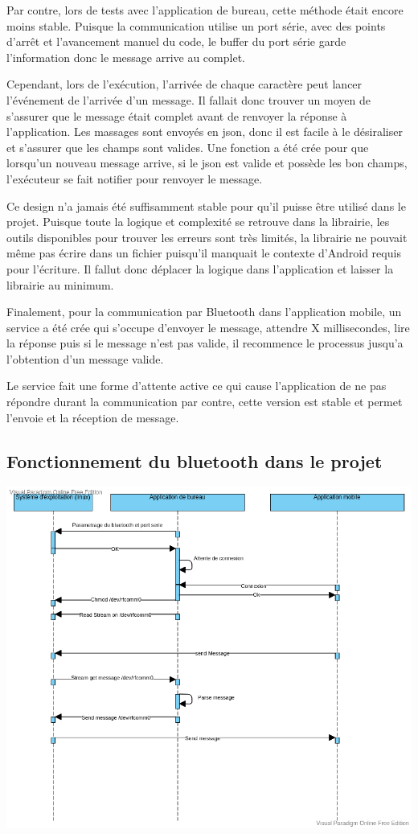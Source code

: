 \documentclass[12pt,fleqn]{article}
\begin{document}
Par contre, lors de tests avec l'application de bureau, cette méthode était encore moins stable. Puisque la communication utilise un port série, avec des points d'arrêt et l'avancement manuel du code, le buffer du port série garde l'information donc le message arrive au complet. 

Cependant, lors de l'exécution, l'arrivée de chaque caractère peut lancer l'événement de l'arrivée d'un message. Il fallait donc trouver un moyen de s'assurer que le message était complet avant de renvoyer la réponse à l'application. Les massages sont envoyés en json, donc il est facile à le désiraliser et s'assurer que les champs sont valides. Une fonction a été crée pour que lorsqu'un nouveau message arrive, si le json est valide et possède les bon champs, l'exécuteur se fait notifier pour renvoyer le message. 

Ce design n'a jamais été suffisamment stable pour qu'il puisse être utilisé dans le projet. Puisque toute la logique et complexité se retrouve dans la librairie, les outils disponibles pour trouver les erreurs sont très limités, la librairie ne pouvait même pas écrire dans un fichier puisqu'il manquait le contexte d'Android requis pour l'écriture. Il fallut donc déplacer la logique dans l'application et laisser la librairie au minimum.

Finalement, pour la communication par Bluetooth dans l'application mobile, un service a été crée qui s'occupe d'envoyer le message, attendre X millisecondes, lire la réponse puis si le message n'est pas valide, il recommence le processus jusqu'a l’obtention d'un message valide. 

Le service fait une forme d'attente active ce qui cause l'application de ne pas répondre durant la communication par contre, cette version est stable et permet l'envoie et la réception de message.
\subsection{Fonctionnement du bluetooth dans le projet}
\includegraphics[scale=0.5]{images/sequence_bluetooth.png}
\end{document}

